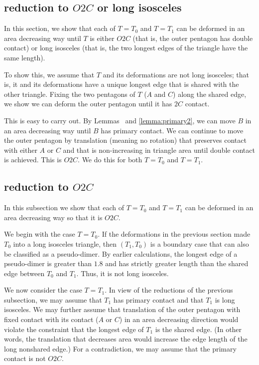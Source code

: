 \subsection{reduction to $O2C$ or long isosceles}

In this section, we show that each of $T=T_0$ and $T=T_1$ can be
deformed in an area decreasing way until $T$ is either $O2C$ (that is,
the outer pentagon has double contact) or long isosceles (that is, the
two longest edges of the triangle have the same length).

To show this, we assume that $T$ and its deformations are not long
isosceles; that is, it and its deformations have a unique longest edge
that is shared with the other triangle.  Fixing the two pentagons of
$T$ ($A$ and $C$) along the shared edge, we show we can deform the
outer pentagon until it has $2C$ contact.

This is easy to carry out.  By Lemmas~ and
\ref{lemma:primary2}, we can move $B$ in an area decreasing way until
$B$ has primary contact.  We can continue to move the outer pentagon
by translation (meaning no rotation) that preserves contact with
either $A$ or $C$ and that is non-increasing in triangle area until
double contact is achieved.  This is $O2C$.  We do this for both
$T=T_0$ and $T=T_1$.

\subsection{reduction to $O2C$}

In this subsection we show that each of $T=T_0$ and $T=T_1$ can be
deformed in an area decreasing way so that it is $O2C$.

We begin with the case $T=T_0$.  If the deformations in the previous
section made $T_0$ into a long isosceles triangle, then $(T_1,T_0)$ is
a boundary case that can also be classified as a pseudo-dimer.  By
earlier calculations, the longest edge of a pseudo-dimer is greater
than $1.8$ and has strictly greater length than the shared edge
between $T_0$ and $T_1$.  Thus, it is not long isosceles.

We now consider the case $T=T_1$.  In view of the reductions of the
previous subsection, we may assume that $T_1$ has primary contact and
that $T_1$ is long isosceles.  We may further assume that translation
of the outer pentagon with fixed contact with its contact ($A$ or $C$)
in an area decreasing direction would violate the constraint that the
longest edge of $T_1$ is the shared edge.  (In other words, the
translation that decreases area would increase the edge length of the
long nonshared edge.)  For a contradiction, we may assume that the
primary contact is not $O2C$.

